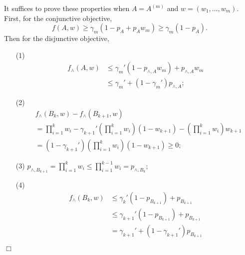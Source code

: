 \documentclass{article}
\newenvironment{proof}{\noindent {\textbf{Proof. }}}{$\Box$ \medskip}
\begin{document}
\begin{proof}
It suffices to prove these properties when $A = A^{(m)}$ and $w = (w_1, \ldots, w_m)$. First, for the conjunctive objective,
$$
f(A, w) \geq \gamma_{m} (1 - p_{A} + p_{A} w_{m}) \geq \gamma_{m} (1 - p_{A}).
$$
Then for the disjunctive objective,
\begin{itemize}
\item[(1)]
\begin{align*}
f_{\wedge}(A, w) &\leq \gamma_m'(1 - p_{\wedge, A} w_m) + p_{\wedge, A} w_m \\
&\leq \gamma_m' + (1 - \gamma_m') p_{\wedge, A};
\end{align*}

\item[(2)]
\begin{align*}
&f_{\wedge}(B_k, w) - f_{\wedge}(B_{k+1}, w)\\
&=\prod_{i=1}^{k}w_i - \gamma_{k+1}' (\prod_{i=1}^{k}w_i) (1 - w_{k+1}) - (\prod_{i=1}^{k}w_i) w_{k+1}\\
&=(1 - \gamma_{k+1}') (\prod_{i=1}^{k}w_i) (1 - w_{k+1}) \geq 0;
\end{align*}

\item[(3)]
$p_{\wedge, B_{k+1}} = \prod_{i=1}^{k} w_i \leq \prod_{i=1}^{k-1} w_i = p_{\wedge, B_k}$;

\item[(4)]
\begin{align*}
f_{\wedge}(B_k, w) &\leq \gamma_{k}' (1 - p_{B_{k+1}}) + p_{B_{k+1}}\\
&\leq \gamma_{k+1}' (1 - p_{B_{k+1}}) + p_{B_{k+1}} \\
&= \gamma_{k+1}' + (1 - \gamma_{k+1}') p_{B_{k+1}}
\end{align*}
\end{itemize}
\end{proof}
\end{document}
